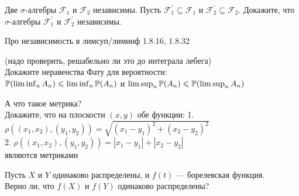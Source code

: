 \begin{problem}
Две $\sigma$-алгебры $\mathcal{F}_{1}$ и $\mathcal{F}_{2}$
независимы. Пусть $\mathcal{F}_{1}^{'}\subseteq \mathcal{F}_{1}$ и
$\mathcal{F}_{2}^{'}\subseteq \mathcal{F}_{2}$. Докажите, что
$\sigma$-алгебры $\mathcal{F}_{1}^{'}$ и $\mathcal{F}_{2}^{'}$
независимы.

\begin{sol}

\end{sol}
\end{problem}

\begin{problem}
Про независимость в лимсуп/лиминф 1.8.16, 1.8.32

\begin{sol}

\end{sol}
\end{problem}

\begin{problem}
 (надо проверить, решабельно ли это до интеграла лебега) \\
Докажите неравенства Фату для вероятности: \\
$\P(\liminf_{n}A_{n})\le \liminf_{n}\P(A_{n})$ и
$\limsup_{n}\P(A_{n})\le \P(\limsup_{n}A_{n})$

\begin{sol}

\end{sol}
\end{problem}

\begin{problem}
 А что такое метрика? \\
Докажите, что на плоскости $(x,y)$ обе функции:
1. $\rho((x_{1},x_{2}),(y_{1},y_{2}))=\sqrt{(x_{1}-y_{1})^{2}+(x_{2}-y_{2})^{2}}$ \\
2. $\rho((x_{1},x_{2}),(y_{1},y_{2}))=|x_{1}-y_{1}|+|x_{2}-y_{2}|$ \\
являются метриками

\begin{sol}

\end{sol}
\end{problem}

\begin{problem}
Пусть $X$ и $Y$ одинаково распределены, и $f(t)$ — борелевская
функция. \\
Верно ли, что $f(X)$ и $f(Y)$ одинаково распределены?

\begin{sol}

\end{sol}
\end{problem}

